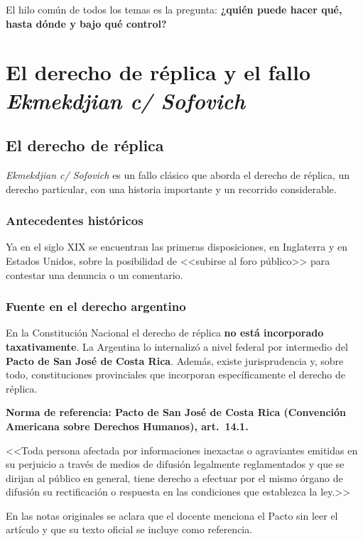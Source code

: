 \documentclass[12pt,oneside]{book}
\begin{document}
El hilo común de todos los temas es la pregunta: \textbf{¿quién puede hacer qué, hasta dónde y bajo qué control?}

\chapter[Derecho de réplica y Ekmekdjian]{El derecho de réplica y el fallo \textit{Ekmekdjian c/ Sofovich}}

\section{El derecho de réplica}

\textit{Ekmekdjian c/ Sofovich} es un fallo clásico que aborda el derecho de réplica, un derecho particular, con una historia importante y un recorrido considerable.

\subsection{Antecedentes históricos}

Ya en el siglo XIX se encuentran las primeras disposiciones, en Inglaterra y en Estados Unidos, sobre la posibilidad de <<subirse al foro público>> para contestar una denuncia o un comentario.

\subsection{Fuente en el derecho argentino}

En la Constitución Nacional el derecho de réplica \textbf{no está incorporado taxativamente}. La Argentina lo internalizó a nivel federal por intermedio del \textbf{Pacto de San José de Costa Rica}. Además, existe jurisprudencia y, sobre todo, constituciones provinciales que incorporan específicamente el derecho de réplica.

\begin{note}
\textbf{Norma de referencia: Pacto de San José de Costa Rica (Convención Americana sobre Derechos Humanos), art.~14.1.}

<<Toda persona afectada por informaciones inexactas o agraviantes emitidas en su perjuicio a través de medios de difusión legalmente reglamentados y que se dirijan al público en general, tiene derecho a efectuar por el mismo órgano de difusión su rectificación o respuesta en las condiciones que establezca la ley.>>

En las notas originales se aclara que el docente menciona el Pacto sin leer el artículo y que su texto oficial se incluye como referencia.
\end{note}
\end{document}
